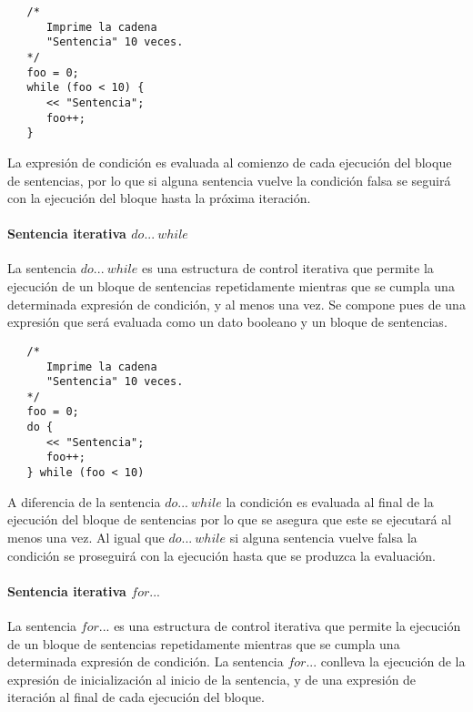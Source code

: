 \begin{lstlisting}
   /*
      Imprime la cadena 
      "Sentencia" 10 veces.
   */
   foo = 0;
   while (foo < 10) {
      << "Sentencia"; 
      foo++;
   }
\end{lstlisting}

La expresión de condición es evaluada al comienzo de cada ejecución del bloque de sentencias, por lo que si alguna sentencia vuelve 
la condición falsa se seguirá con la ejecución del bloque hasta la próxima iteración.

\paragraph{Sentencia iterativa $do...\ while$} \label{sec:stmt_dowhile}

La sentencia $do...\ while$ es una estructura de control iterativa que permite la ejecución de un bloque de 
sentencias repetidamente mientras que se cumpla una determinada expresión de condición, y al menos una vez. Se compone pues de una expresión que será evaluada como 
un dato booleano y un bloque de sentencias. \\


\begin{lstlisting}
   /*
      Imprime la cadena 
      "Sentencia" 10 veces.
   */
   foo = 0;
   do {
      << "Sentencia"; 
      foo++;
   } while (foo < 10)
\end{lstlisting}

A diferencia de la sentencia $do...\ while$ la condición es evaluada al final de la ejecución del bloque de sentencias por lo que se asegura que este
se ejecutará al menos una vez. Al igual que $do...\ while$ si alguna sentencia vuelve falsa la condición se proseguirá con la ejecución hasta que se 
produzca la evaluación.

\paragraph{Sentencia iterativa $for...$} \label{sec:stmt_for}

La sentencia $for...$ es una estructura de control iterativa que permite la ejecución de un bloque de 
sentencias repetidamente mientras que se cumpla una determinada expresión de condición. La sentencia $for...$ conlleva
la ejecución de la expresión de inicialización al inicio de la sentencia, y de una expresión de iteración al final de cada ejecución del
bloque. \\


